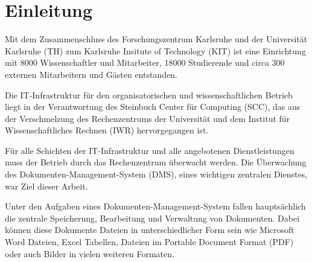 \section{Einleitung}







Mit dem Zusammenschluss des Forschungszentrum Karlsruhe und der Universität Karlsruhe (TH) zum Karlsruhe Insitute of Technology (KIT) ist eine Einrichtung mit 8000 Wissenschaftler und Mitarbeiter, 18000 Studierende und circa 300 externen Mitarbeitern und Gästen entstanden.


Die IT-Infrastruktur für den organisatorischen und wissenschaftlichen Betrieb liegt in der Verantwortung des Steinbuch Center für Computing (SCC), das aus der Verschmelzung des Rechenzentrums der Universität und dem Institut für Wissenschaftliches Rechnen (IWR) hervorgegangen ist.

Für alle Schichten der IT-Infrastruktur und alle angebotenen Dienstleistungen muss der Betrieb durch das Rechenzentrum überwacht werden.
Die Überwachung des Dokumenten-Management-System (\gls{DMS}), eines wichtigen zentralen Dienstes, war Ziel dieser Arbeit.



Unter den Aufgaben eines Dokumenten-Management-System fallen hauptsächlich die zentrale Speicherung, Bearbeitung und Verwaltung von Dokumenten.
Dabei können diese Dokumente Dateien in unterschiedlicher Form sein wie Microsoft Word Dateien, Excel Tabellen, Dateien im Portable Document Format (\gls{PDF}) oder auch Bilder in vielen weiteren Formaten.

